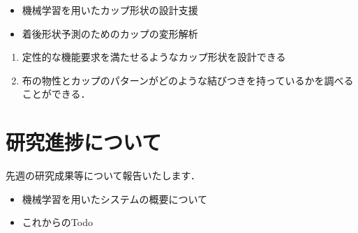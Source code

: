 \documentclass[11pt]{jsarticle}
\begin{document}
	\articleSPRabst
		\begin{itemize}
			\item 機械学習を用いたカップ形状の設計支援
			\item 着後形状予測のためのカップの変形解析
		\end{itemize}
		
		
	\articleSPRobj
		\begin{enumerate}
			\item 定性的な機能要求を満たせるようなカップ形状を設計できる
			\item 布の物性とカップのパターンがどのような結びつきを持っているかを調べることができる．
		\end{enumerate}
	\articleSPRitemsone
		
		\tableofcontents
		
		
	\articleSPRitemstwo
	\renewcommand{\labelitemi}{$\blacktriangledown$}
	\section{研究進捗について}
		先週の研究成果等について報告いたします．
		\begin{itemize}
			\item 機械学習を用いたシステムの概要について
			\item これからのTodo
		\end{itemize}
\end{document}
